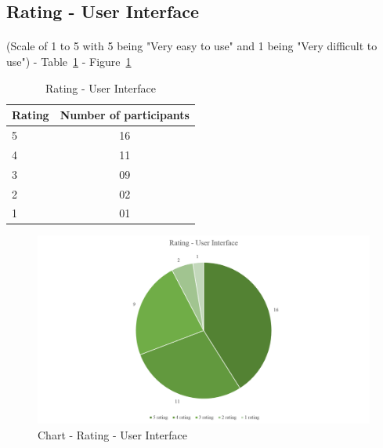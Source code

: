 \subsection{Rating - User Interface}

\paragraph{} (Scale of 1 to 5 with 5 being "Very easy to use" and 1 being "Very difficult to use") - Table~\ref{table-survey-rating-UserInterface} - Figure~\ref{image-ratingUserInterface}

\begin{table} [H]
\centering
\begin{tabular}{|l|c|}
\hline
Rating & Number of participants \\
\hline
5	&16 \\
4	&11 \\
3	&09 \\
2	&02 \\
1	&01 \\
\hline
\end{tabular}
\caption{Rating - User Interface}
\label{table-survey-rating-UserInterface}
\end{table}

\begin {figure} [H]
\centering
\includegraphics [scale=0.55] {ratingUserInterface}
\caption [Chart - Rating - User Interface] {Chart - Rating - User Interface}
\label {image-ratingUserInterface}
\end {figure}

